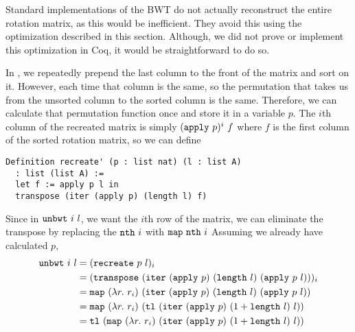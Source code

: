 \documentclass[sigplan,10pt,anonymous,review]{thesis}
\begin{document}
Standard implementations of the BWT do not actually reconstruct the
entire rotation matrix, as this would be inefficient. They avoid this
using the optimization described in this section. Although, we did not
prove or implement this optimization in Coq, it would be
straightforward to do so.

In , we repeatedly prepend the last column to the front
of the matrix and sort on it. However, each time that column is the
same, so the permutation that takes us from the unsorted column to the
sorted column is the same. Therefore, we can calculate that
permutation function once and store it in a variable $p$. The $i$th
column of the recreated matrix is simply $(\texttt{\textup{apply}}~p)^i~f$ where
$f$ is the first column of the sorted rotation matrix, so we can
define
\begin{lstlisting}
Definition recreate' (p : list nat) (l : list A)
  : list (list A) :=
  let f := apply p l in
  transpose (iter (apply p) (length l) f)
\end{lstlisting}

Since in $\texttt{\textup{unbwt}}~i~l$, we want the $i$th row of the matrix, we
can eliminate the transpose by replacing the $\texttt{\textup{nth}}~i$ with
$\texttt{\textup{map}}~\texttt{\textup{nth}}~i$ Assuming we already have calculated $p$,
\begin{align*}
  \texttt{\textup{unbwt}}~i~l &= (\texttt{\textup{recreate}}~p~l)_i \\
  &= (\texttt{\textup{transpose}}~(\texttt{\textup{iter}}~(\texttt{\textup{apply}}~p)~(\texttt{\textup{length}}~l)~(\texttt{\textup{apply}}~p~l)))_i \\
  &= \texttt{\textup{map}}~(\lambda
  r.~r_i)~(\texttt{\textup{iter}}~(\texttt{\textup{apply}}~p)~(\texttt{\textup{length}}~l)~(\texttt{\textup{apply}}~p~l)) \\
  &= \texttt{\textup{map}}~(\lambda r.~r_i)~(\texttt{\textup{tl}}~(\texttt{\textup{iter}}~(\texttt{\textup{apply}}~p)~(1 +
  \texttt{\textup{length}}~l)~l)) \\
  &= \texttt{\textup{tl}}~(\texttt{\textup{map}}~(\lambda r.~r_i)~(\texttt{\textup{iter}}~(\texttt{\textup{apply}}~p)~(1 + \texttt{\textup{length}}~l)~l))
\end{align*}
\end{document}
